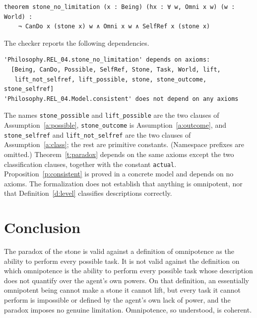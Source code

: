 \documentclass{situationist-preprint}
\begin{document}
\begin{lstlisting}
theorem stone_no_limitation (x : Being) (hx : ∀ w, Omni x w) (w : World) :
    ¬ CanDo x (stone x) w ∧ Omni x w ∧ SelfRef x (stone x)
\end{lstlisting}

The checker reports the following dependencies.

\begin{lstlisting}
'Philosophy.REL_04.stone_no_limitation' depends on axioms:
  [Being, CanDo, Possible, SelfRef, Stone, Task, World, lift,
   lift_not_selfref, lift_possible, stone, stone_outcome, stone_selfref]
'Philosophy.REL_04.Model.consistent' does not depend on any axioms
\end{lstlisting}

The names \texttt{stone\_possible} and \texttt{lift\_possible} are the two clauses of Assumption~\ref{a:possible}, \texttt{stone\_outcome} is Assumption~\ref{a:outcome}, and \texttt{stone\_selfref} and \texttt{lift\_not\_selfref} are the two clauses of Assumption~\ref{a:class}; the rest are primitive constants. (Namespace prefixes are omitted.) Theorem~\ref{t:paradox} depends on the same axioms except the two classification clauses, together with the constant \texttt{actual}. Proposition~\ref{p:consistent} is proved in a concrete model and depends on no axioms. The formalization does not establish that anything is omnipotent, nor that Definition~\ref{d:level} classifies descriptions correctly.

\section{Conclusion}

The paradox of the stone is valid against a definition of omnipotence as the ability to perform every possible task. It is not valid against the definition on which omnipotence is the ability to perform every possible task whose description does not quantify over the agent's own powers. On that definition, an essentially omnipotent being cannot make a stone it cannot lift, but every task it cannot perform is impossible or defined by the agent's own lack of power, and the paradox imposes no genuine limitation. Omnipotence, so understood, is coherent.
\end{document}
